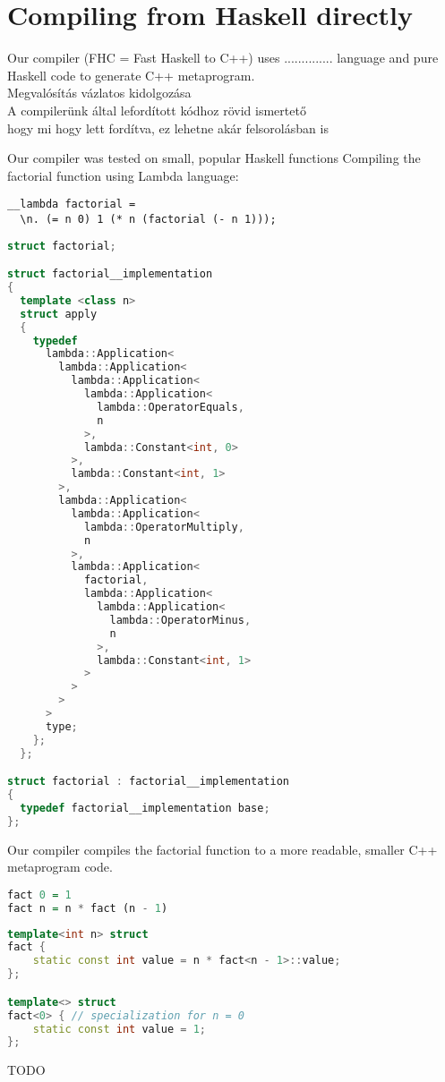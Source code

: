 \documentclass{article}
\begin{document}
\section{Compiling from Haskell directly}
Our compiler (FHC = Fast Haskell to C++) uses .............. language and pure Haskell code to generate C++ metaprogram.\\
\colorbox{orange!30}{Megvalósítás vázlatos kidolgozása}\\
\colorbox{orange!30}{A compilerünk által lefordított kódhoz rövid ismertető}\\
\colorbox{orange!30}{hogy mi hogy lett fordítva, ez lehetne akár felsorolásban is}\\

\begin{comment}
HASKELL CODE\\
\centerline{\Bigg\Downarrow}
C++ CODE
\end{comment}
Our compiler was tested on small, popular Haskell functions\cite{bartoszhaskell}
Compiling the factorial function using Lambda\cite{porkolab2009c++} language:
\begin{center}
\begin{lstlisting}
__lambda factorial =
  \n. (= n 0) 1 (* n (factorial (- n 1)));
\end{lstlisting}
\Bigg\Downarrow
\begin{lstlisting}[language=C++]
struct factorial;

struct factorial__implementation
{
  template <class n>
  struct apply
  {
    typedef
      lambda::Application<
        lambda::Application<
          lambda::Application<
            lambda::Application<
              lambda::OperatorEquals,
              n
            >,
            lambda::Constant<int, 0>
          >,
          lambda::Constant<int, 1>
        >,
        lambda::Application<
          lambda::Application<
            lambda::OperatorMultiply,
            n
          >,
          lambda::Application<
            factorial,
            lambda::Application<
              lambda::Application<
                lambda::OperatorMinus,
                n
              >,
              lambda::Constant<int, 1>
            >
          >
        >
      >
      type;
    };
  };

struct factorial : factorial__implementation
{
  typedef factorial__implementation base;
};
\end{lstlisting}
\end{center}

Our compiler compiles the factorial function to a more readable, smaller C++ metaprogram code.
\begin{center}
\begin{lstlisting}[language=Haskell]
fact 0 = 1
fact n = n * fact (n - 1)
\end{lstlisting}
\Bigg\Downarrow
\begin{lstlisting}[language=C++]
template<int n> struct
fact {
    static const int value = n * fact<n - 1>::value;
};

template<> struct
fact<0> { // specialization for n = 0
    static const int value = 1;
};
\end{lstlisting}
\end{center}
TODO
\end{document}
